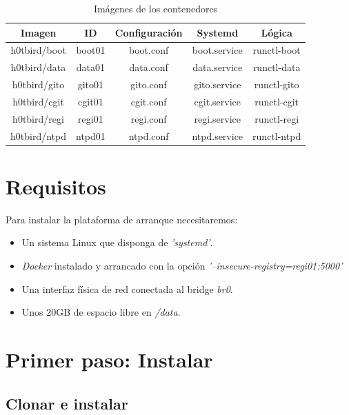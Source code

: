 \documentclass[a4paper,12pt,spanish,final]{epsc_tfc_pfc}
\begin{document}
\begin{table}[h]
\centering
\begin{tabular}{|c|c|c|c|c|}
\hline
\rowcolor[HTML]{C0C0C0}
\textbf{Imagen} & \textbf{ID} & \textbf{Configuración} & \textbf{Systemd} & \textbf{Lógica} \\ \hline
h0tbird/boot    & boot01      & boot.conf              & boot.service     & runctl-boot     \\ \hline
h0tbird/data    & data01      & data.conf              & data.service     & runctl-data     \\ \hline
h0tbird/gito    & gito01      & gito.conf              & gito.service     & runctl-gito     \\ \hline
h0tbird/cgit    & cgit01      & cgit.conf              & cgit.service     & runctl-cgit     \\ \hline
h0tbird/regi    & regi01      & regi.conf              & regi.service     & runctl-regi     \\ \hline
h0tbird/ntpd    & ntpd01      & ntpd.conf              & ntpd.service     & runctl-ntpd     \\ \hline
\end{tabular}
\caption{Imágenes de los contenedores}
\end{table}

\clearpage

\section{Requisitos}

Para instalar la plataforma de arranque necesitaremos:

\begin{itemize}
  \item Un sistema Linux que disponga de \emph{'systemd'}.
  \item \emph{Docker} instalado y arrancado con la opción \emph{'--insecure-registry=regi01:5000'}
  \item Una interfaz física de red conectada al bridge \emph{br0}.
  \item Unos 20GB de espacio libre en \emph{/data}.
\end{itemize}

\section{Primer paso: Instalar}

\subsection{Clonar e instalar}
\end{document}
